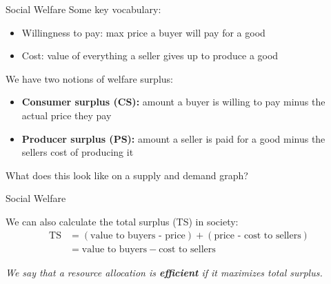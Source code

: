 \documentclass[compress]{beamer}
\begin{document}

\begin{frame}{Social Welfare}
Some key vocabulary:
\begin{itemize}
    \item Willingness to pay: max price a buyer will pay for a good
    \item Cost: value of everything a seller gives up to produce a good
\end{itemize}

\begin{block}{We have two notions of welfare surplus:}
    \begin{itemize}
        \item \textbf{Consumer surplus (CS):} amount a buyer is willing to pay minus the actual price they pay
        \item \textbf{Producer surplus (PS): } amount a seller is paid for a good minus the sellers cost of producing it
    \end{itemize}
\end{block}

    \medskip

    What does this look like on a supply and demand graph?
\end{frame}

\begin{frame}{Social Welfare}
\begin{block}{   We can also calculate the total surplus (TS) in society:}
    \begin{align*}
        \text{TS} &= (\text{value to buyers - price}) + (\text{price - cost to sellers})\\
        &= \text{value to buyers} - \text{cost to sellers}
    \end{align*}
\end{block}

\vspace{3mm}

\textit{We say that a resource allocation is \textbf{efficient} if it maximizes total surplus.}
\end{frame}
\end{document}

